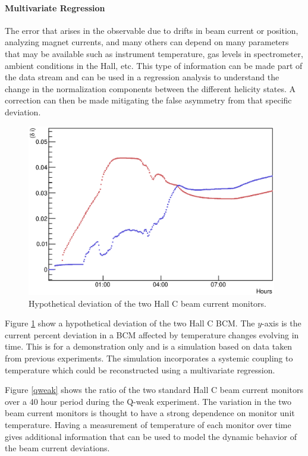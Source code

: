 \iffalse
\paragraph{ Multivariate Regression }\mbox{}
\label{regress}

The error that arises in the observable due to drifts in beam current or position, analyzing magnet currents,
and many others can depend on many parameters that may be available such as instrument temperature, gas levels in spectrometer,
ambient conditions in the Hall, etc.  This type of information can be made part of the data stream and can be used in a regression
analysis to understand the change in the normalization components between the different helicity states.  A correction can then
be made mitigating the false asymmetry from that specific deviation.
\begin{figure}
\begin{center}
\includegraphics[height=75mm, angle=0]{./figs/dev}
\end{center}
\caption{Hypothetical deviation of the two Hall C beam current monitors.}
\label{dev}
\end{figure}
Figure \ref{dev} show a hypothetical deviation of the two Hall C BCM.  The $y$-axis is the current percent deviation in a BCM affected by temperature changes
evolving in time.  This is for a demonstration only and is a simulation based on
data taken from previous experiments.  The simulation incorporates a systemic coupling
to temperature which could be reconstructed using a multivariate regression.

Figure \ref{qweak} shows the ratio of the two standard Hall C beam current monitors over a 40 hour period during the Q-weak experiment.  The
variation in the two beam current monitors is thought to have a strong dependence on monitor unit temperature.  Having a measurement of temperature of each
monitor over time gives additional information that can be used to model the dynamic behavior of the beam current deviations.  


